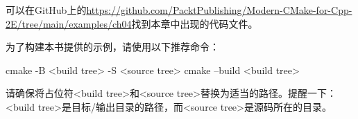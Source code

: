 
可以在GitHub上的\url{https://github.com/PacktPublishing/Modern-CMake-for-Cpp-2E/tree/main/examples/ch04}找到本章中出现的代码文件。

为了构建本书提供的示例，请使用以下推荐命令：

\begin{shell}
cmake -B <build tree> -S <source tree>
cmake --build <build tree>
\end{shell}

请确保将占位符<build tree>和<source tree>替换为适当的路径。提醒一下：<build tree>是目标/输出目录的路径，而<source tree>是源码所在的目录。











